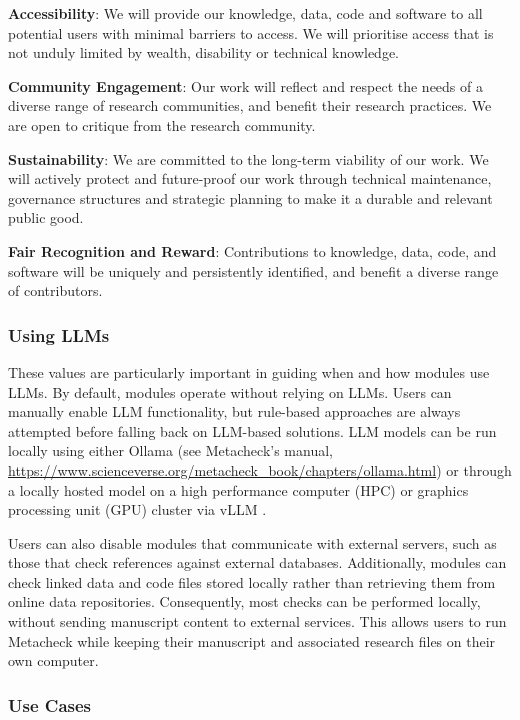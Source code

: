 \documentclass[
  letterpaper,
  12pt]{article}
\begin{document}
\textbf{Accessibility}: We will provide our knowledge, data, code and
software to all potential users with minimal barriers to access. We will
prioritise access that is not unduly limited by wealth, disability or
technical knowledge.

\textbf{Community Engagement}: Our work will reflect and respect the
needs of a diverse range of research communities, and benefit their
research practices. We are open to critique from the research community.

\textbf{Sustainability}: We are committed to the long-term viability of
our work. We will actively protect and future-proof our work through
technical maintenance, governance structures and strategic planning to
make it a durable and relevant public good.

\textbf{Fair Recognition and Reward}: Contributions to knowledge, data,
code, and software will be uniquely and persistently identified, and
benefit a diverse range of contributors.

\subsubsection{Using LLMs}\label{using-llms}

These values are particularly important in guiding when and how modules
use LLMs. By default, modules operate without relying on LLMs. Users can
manually enable LLM functionality, but rule-based approaches are always
attempted before falling back on LLM-based solutions. LLM models can be
run locally using either Ollama (see Metacheck's manual,
\url{https://www.scienceverse.org/metacheck_book/chapters/ollama.html})
or through a locally hosted model on a high performance computer (HPC)
or graphics processing unit (GPU) cluster via vLLM .

Users can also disable modules that communicate with external servers,
such as those that check references against external databases.
Additionally, modules can check linked data and code files stored
locally rather than retrieving them from online data repositories.
Consequently, most checks can be performed locally, without sending
manuscript content to external services. This allows users to run
Metacheck while keeping their manuscript and associated research files
on their own computer.

\subsubsection{Use Cases}\label{use-cases}
\end{document}
